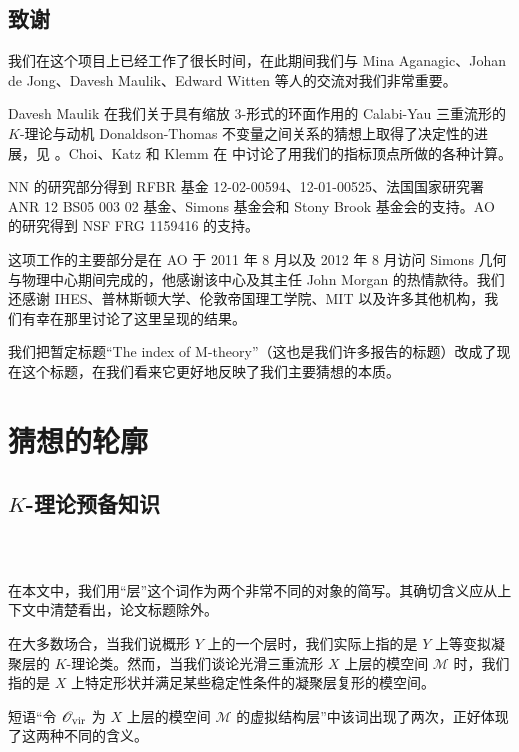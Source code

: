 \documentclass[12pt]{article}
\newcommand{\Ovir}{\mathscr{O}_{\textup{vir}}}
\newcommand{\cM}{\mathcal{M}}
\theoremstyle{definition}
\begin{document}
\subsection{致谢}

我们在这个项目上已经工作了很长时间，在此期间我们与 Mina Aganagic、Johan de Jong、Davesh Maulik、Edward Witten 等人的交流对我们非常重要。

Davesh Maulik 在我们关于具有缩放 $3$-形式的环面作用的 Calabi-Yau 三重流形的 $K$-理论与动机 Donaldson-Thomas 不变量之间关系的猜想上取得了决定性的进展，见 \cite{Dmot}。Choi、Katz 和 Klemm 在 \cite{CKK} 中讨论了用我们的指标顶点所做的各种计算。

NN 的研究部分得到 RFBR 基金 12-02-00594、12-01-00525、法国国家研究署 ANR 12 BS05 003 02 基金、Simons 基金会和 Stony Brook 基金会的支持。AO 的研究得到 NSF FRG 1159416 的支持。

这项工作的主要部分是在 AO 于 2011 年 8 月以及 2012 年 8 月访问 Simons 几何与物理中心期间完成的，他感谢该中心及其主任 John Morgan 的热情款待。我们还感谢 IHES、普林斯顿大学、伦敦帝国理工学院、MIT 以及许多其他机构，我们有幸在那里讨论了这里呈现的结果。

我们把暂定标题“The index of M-theory”（这也是我们许多报告的标题）改成了现在这个标题，在我们看来它更好地反映了我们主要猜想的本质。
\section{猜想的轮廓}\label{s1}

\subsection{$K$-理论预备知识}

\subsubsection{\ }

在本文中，我们用“层”这个词作为两个非常不同的对象的简写。其确切含义应从上下文中清楚看出，论文标题除外。

在大多数场合，当我们说概形 $Y$ 上的一个层时，我们实际上指的是 $Y$ 上等变拟凝聚层的 $K$-理论类。然而，当我们谈论光滑三重流形 $X$ 上层的模空间 $\cM$ 时，我们指的是 $X$ 上特定形状并满足某些稳定性条件的凝聚层复形的模空间。

短语“令 $\Ovir$ 为 $X$ 上层的模空间 $\cM$ 的虚拟结构层”中该词出现了两次，正好体现了这两种不同的含义。

\subsubsection{\ }
\end{document}
